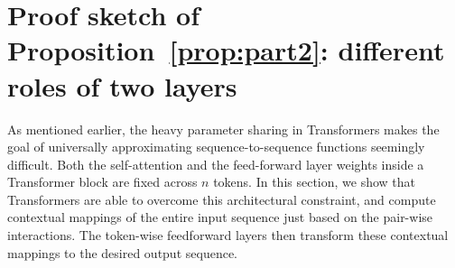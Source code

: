 \documentclass{article} %
\def\mX{{\bm{X}}}
\def\mY{{\bm{Y}}}
\begin{document}
\vspace*{-5pt}
\section{Proof sketch of Proposition~\ref{prop:part2}: different roles of two layers}
\vspace*{-3pt}
\label{sec:different-roles}





As mentioned earlier, the heavy parameter sharing in Transformers makes the goal of universally approximating sequence-to-sequence functions seemingly difficult. Both the self-attention and the feed-forward layer weights inside a Transformer block are fixed across $n$ tokens. In this section, we show that Transformers are able to overcome this architectural constraint, and compute contextual mappings of the entire input sequence just based on the pair-wise interactions. The token-wise feedforward layers then transform these contextual mappings to the desired output sequence. %
\end{document}
